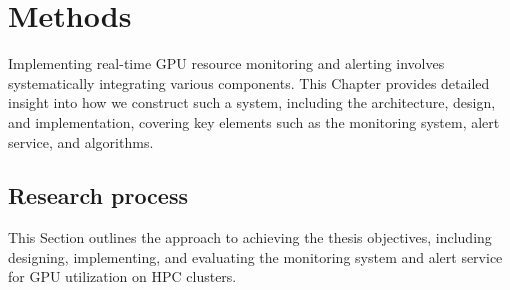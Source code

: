 \chapter{Methods}
\label{chap:methods}
Implementing real-time GPU resource monitoring and alerting involves systematically integrating various components. This Chapter provides detailed insight into how we construct such a system, including the architecture, design, and implementation, covering key elements such as the monitoring system, alert service, and algorithms.

\section{Research process}
This Section outlines the approach to achieving the thesis objectives, including designing, implementing, and evaluating the monitoring system and alert service for GPU utilization on HPC clusters.

